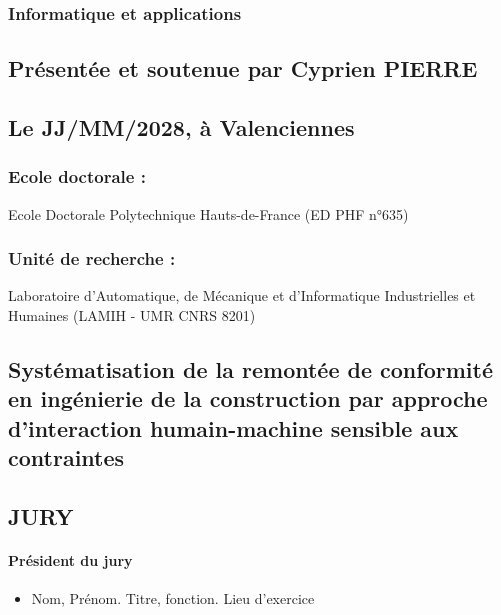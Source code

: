 \documentclass[a4paper,12pt]{article}
\begin{document}
\begin{titlepage}
\begin{center}
\subsubsection*{Informatique et applications}
\label{sec:org53700bc}
\vspace*{12pt}
\subsection*{Présentée et soutenue par Cyprien PIERRE }
\label{sec:org502df80}
\subsection*{Le JJ/MM/2028, à Valenciennes}
\label{sec:orgfe2e9c5}
\end{center}
\subsubsection*{Ecole doctorale :}
\label{sec:org1c33166}
\vspace*{-6pt}

Ecole Doctorale Polytechnique Hauts-de-France (ED PHF n°635)
\subsubsection*{Unité de recherche :}
\label{sec:orgb5eff7a}
\vspace*{-6pt}

Laboratoire d'Automatique, de Mécanique et d'Informatique Industrielles et Humaines (LAMIH - UMR CNRS 8201)

\begin{center}
\section*{Systématisation de la remontée de conformité en ingénierie de la construction par approche d'interaction humain-machine sensible aux contraintes}
\label{sec:org4b63b13}
\vspace*{12pt}
\subsection*{JURY}
\label{sec:org523b2c3}
\vspace*{-12pt}
\end{center}
\begin{multicols}{2}
\paragraph*{Président du jury}
\label{sec:orgfb8618d}
\begin{itemize}
\item Nom, Prénom. Titre, fonction. Lieu d'exercice
\vspace*{-12pt}
\end{itemize}

\end{multicols}
\end{titlepage}
\end{document}
